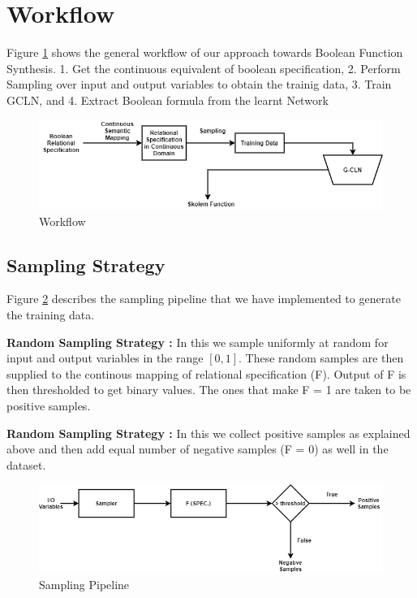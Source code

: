 \section{Workflow}
Figure \ref{fig:workflow} shows the general workflow of our approach towards Boolean Function Synthesis.
1. Get the continuous equivalent of boolean specification, 2. Perform Sampling over input and output variables to obtain the trainig data,
3. Train GCLN, and 4. Extract Boolean formula from the learnt Network

\begin{figure}[t]
	\centering
    \includegraphics[scale=0.5]{workflow_bfs.png}
    \caption{Workflow}
    \label{fig:workflow}
\end{figure}

\subsection{Sampling Strategy}\label{sample}
Figure \ref{fig:sampling} describes the sampling pipeline that we have implemented to 
generate the training data.

\noindent\textbf{Random Sampling Strategy : }\label{sample1} In this we sample uniformly at random 
for input and output variables in the range $[0, 1]$. 
These random samples are then supplied to the continous mapping of relational specification (F). 
Output of F is then thresholded to get binary values. The ones that make F = 1 are taken to be 
positive samples. 

\noindent\textbf{Random Sampling Strategy : }\label{sample2} In this we collect positive samples 
as explained above and then add equal number of negative samples (F = 0) as well in the dataset.

\begin{figure}
	\centering
    \includegraphics[scale=0.5]{sampling_bfs.png}
    \caption{Sampling Pipeline}
    \label{fig:sampling}
\end{figure}

